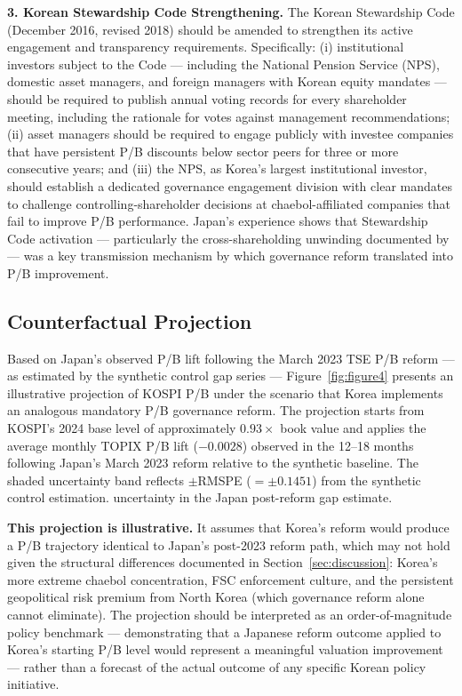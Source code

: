 \documentclass[12pt]{article}
\begin{document}
\textbf{3. Korean Stewardship Code Strengthening.} The Korean Stewardship Code (December
2016, revised 2018) should be amended to strengthen its active engagement and transparency
requirements. Specifically: (i) institutional investors subject to the Code --- including
the National Pension Service (NPS), domestic asset managers, and foreign managers with
Korean equity mandates --- should be required to publish annual voting records for every
shareholder meeting, including the rationale for votes against management recommendations;
(ii) asset managers should be required to engage publicly with investee companies that have
persistent P/B discounts below sector peers for three or more consecutive years; and (iii)
the NPS, as Korea's largest institutional investor, should establish a dedicated governance
engagement division with clear mandates to challenge controlling-shareholder decisions at
chaebol-affiliated companies that fail to improve P/B performance. Japan's experience shows
that Stewardship Code activation --- particularly the cross-shareholding unwinding documented
by \citet{miyajima2023} --- was a key transmission mechanism by which governance reform
translated into P/B improvement.

\subsection{Counterfactual Projection}

Based on Japan's observed P/B lift following the March 2023 TSE P/B reform --- as estimated
by the synthetic control gap series --- Figure~\ref{fig:figure4} presents an illustrative
projection of KOSPI P/B under the scenario that Korea implements an analogous mandatory
P/B governance reform. The projection starts from KOSPI's 2024 base level of approximately
$0.93\times$ book value and applies the average monthly TOPIX P/B lift ($-0.0028$) observed in the
12--18 months following Japan's March 2023 reform relative to the synthetic baseline. The shaded uncertainty band reflects
$\pm$RMSPE ($= \pm 0.1451$) from the synthetic control estimation.
uncertainty in the Japan post-reform gap estimate.

\textbf{This projection is illustrative.} It assumes that Korea's reform would produce a
P/B trajectory identical to Japan's post-2023 reform path, which may not hold given the
structural differences documented in Section~\ref{sec:discussion}: Korea's more extreme
chaebol concentration, FSC enforcement culture, and the persistent geopolitical risk premium
from North Korea (which governance reform alone cannot eliminate). The projection should be
interpreted as an order-of-magnitude policy benchmark --- demonstrating that a Japanese
reform outcome applied to Korea's starting P/B level would represent a meaningful valuation
improvement --- rather than a forecast of the actual outcome of any specific Korean policy
initiative.
\end{document}
